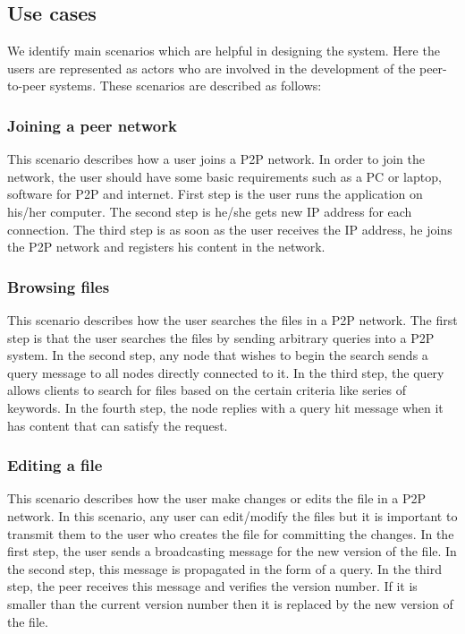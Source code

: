 
\subsection{Use cases}
We identify main scenarios which are helpful in designing the system. Here the users are represented as actors who are involved in the development of the peer-to-peer systems. These scenarios are described as follows:

	\subsubsection{Joining a peer network}
	   This scenario describes how a user joins a P2P network. In order to join the network, the user should have some basic requirements such as a PC or laptop, software for P2P and internet. First step is the user runs the application on his/her computer. The second step is he/she gets new IP address for each connection. The third step is as soon as the user receives the IP address, he joins the P2P network and registers his content in the network.
	\subsubsection{Browsing files}
	 This scenario describes how the user searches the files in a P2P network.  The first step is that the user searches the files by sending arbitrary queries into a P2P system. In the second step, any node that wishes to begin the search sends a query message to all nodes directly connected to it. In the third step, the query allows clients to search for files based on the certain criteria like series of keywords. In the fourth step, the node replies with a query hit message when it has content that can satisfy the request.
	\subsubsection{Editing a file}
          This scenario describes how the user make changes or edits the file in a P2P network. In this scenario, any user can edit/modify the files but it is important to transmit them to the user who creates the file for committing the changes. In the first step, the user sends a broadcasting  message for the new version of the file.  In the second step, this message is propagated in the form of a query. In the third step, the peer receives this message and verifies the version number. If it is smaller than the current version number then it is replaced by the new version of the file.
           
           
          